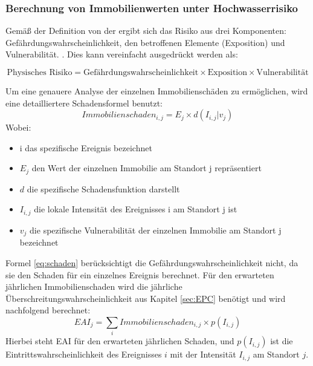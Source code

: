 \subsubsection{Berechnung von Immobilienwerten unter Hochwasserrisiko}
Gemäß der Definition von der \textcite{undro1979} ergibt sich das Risiko aus drei Komponenten: Gefährdungswahrscheinlichkeit,  den betroffenen Elemente (Exposition) und Vulnerabilität. \parencite{coburn1991vulnerability}. Dies kann vereinfacht ausgedrückt werden als:

\begin{equation}
    \text{Physisches Risiko} = \text{Gefährdungswahrscheinlichkeit} \times \text{Exposition} \times \text{Vulnerabilität}
\end{equation}

Um eine genauere Analyse der einzelnen Immobilienschäden zu ermöglichen, wird eine detailliertere Schadensformel \parencite{vanweddingen2023physicalrisk} benutzt:
\begin{equation}
    Immobilienschaden_{i,j} = E_j \times d(I_{i,j}|v_j)
    \label{eq:schaden}
\end{equation}
Wobei:
\begin{itemize}
    \item i das spezifische Ereignis bezeichnet
    \item $E_j$ den Wert der einzelnen Immobilie am Standort j repräsentiert
    \item $d$ die spezifische Schadensfunktion darstellt
    \item $I_{i,j}$ die lokale Intensität des Ereignisses i am Standort j ist
    \item $v_j$ die spezifische Vulnerabilität der einzelnen Immobilie am Standort j bezeichnet
\end{itemize}

Formel \ref{eq:schaden} berücksichtigt die Gefährdungswahrscheinlichkeit nicht, da sie den Schaden für ein einzelnes Ereignis berechnet. Für den erwarteten jährlichen Immobilienschaden wird die jährliche Überschreitungswahrscheinlichkeit aus Kapitel \ref{sec:EPC} benötigt und wird nachfolgend berechnet:
\begin{equation}
    EAI_j = \sum_i Immobilienschaden_{i,j} \times p(I_{i,j})
    \label{eq:EAI}
\end{equation}
Hierbei steht \acs{EAI} für den erwarteten jährlichen Schaden, und \( p(I_{i,j}) \) ist die Eintrittswahrscheinlichkeit des Ereignisses \( i \) mit der Intensität \( I_{i,j} \) am Standort \( j \).

